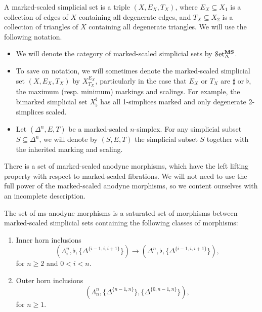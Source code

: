 \documentclass[main.tex]{subfiles}
\begin{document}
A marked-scaled simplicial set is a triple $(X, E_{X}, T_{X})$, where $E_{X} \subseteq X_{1}$ is a collection of edges of $X$ containing all degenerate edges, and $T_{X} \subseteq X_{2}$ is a collection of triangles of $X$ containing all degenerate triangles. We will use the following notation.
\begin{itemize}
  \item We will denote the category of marked-scaled simplicial sets by $\mathcal{S}\mathrm{et}_{\Delta}^{\mathbf{MS}}$.

  \item To save on notation, we will sometimes denote the marked-scaled simplicial set $(X, E_{X}, T_{X})$ by $X^{E_{X}}_{T_{X}}$, particularly in the case that $E_{X}$ or $T_{X}$ are $\sharp$ or $\flat$, the maximum (resp. minimum) markings and scalings. For example, the bimarked simplicial set $X^{\sharp}_{\flat}$ has all 1-simplices marked and only degenerate 2-simplices scaled.

  \item Let $(\Delta^{n}, E, T)$ be a marked-scaled $n$-simplex. For any simplicial subset $S \subseteq \Delta^{n}$, we will denote by $(S, E, T)$ the simplicial subset $S$ together with the inherited marking and scaling.
\end{itemize}

There is a set of marked-scaled anodyne morphisms, which have the left lifting property with respect to marked-scaled fibrations. We will not need to use the full power of the marked-scaled anodyne morphisms, so we content ourselves with an incomplete description.

\begin{definition}
  \label{def:ms-anodyne_morphisms}
  The set of ms-anodyne morphisms is a saturated set of morphisms between marked-scaled simplicial sets containing the following classes of morphisms:
  \begin{enumerate}[label=(A\arabic*)]
    \item\label{item:innerms} Inner horn inclusions
      \begin{equation*}
        (\Lambda^{n}_{i}, \flat, \{\Delta^{\{i-1,i,i+1\}}\}) \to (\Delta^{n}, \flat, \{\Delta^{\{i-1,i,i+1\}}\}),
      \end{equation*}
      for $n \geq 2$ and $0 < i < n$.

    \item\label{item:outerms} Outer horn inclusions
      \begin{equation*}
        (\Lambda^{n}_{n}, \{\Delta^{\{n-1,n\}}\}, \{\Delta^{\{0, n-1, n\}}\}),
      \end{equation*}
      for $n \geq 1$.
  \end{enumerate}
\end{definition}
\end{document}
